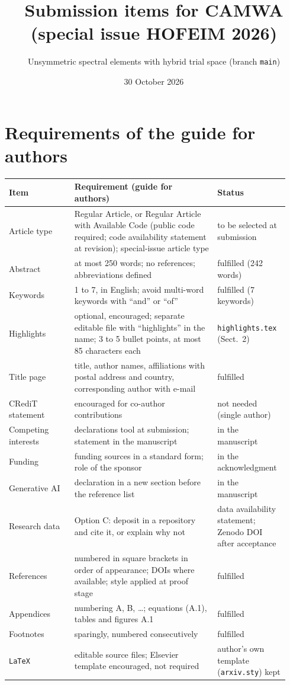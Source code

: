 \documentclass[10pt,a4paper]{article}
\title{Submission items for CAMWA (special issue HOFEIM 2026)}
\author{Unsymmetric spectral elements with hybrid trial space (branch \texttt{main})}
\date{30 October 2026}
\begin{document}
\maketitle
\vspace{-1em}

\section{Requirements of the guide for authors}

\begin{center}\small
\begin{tabular}{@{}p{0.22\linewidth}p{0.48\linewidth}p{0.24\linewidth}@{}}
\toprule
Item & Requirement (guide for authors) & Status \\
\midrule
Article type & Regular Article, or Regular Article with Available Code (public code required; code availability statement at revision); special-issue article type & to be selected at submission \\
Abstract & at most 250 words; no references; abbreviations defined & fulfilled (242 words) \\
Keywords & 1 to 7, in English; avoid multi-word keywords with ``and'' or ``of'' & fulfilled (7 keywords) \\
Highlights & optional, encouraged; separate editable file with ``highlights'' in the name; 3 to 5 bullet points, at most 85 characters each & \texttt{highlights.tex} (Sect.~2) \\
Title page & title, author names, affiliations with postal address and country, corresponding author with e-mail & fulfilled \\
CRediT statement & encouraged for co-author contributions & not needed (single author) \\
Competing interests & declarations tool at submission; statement in the manuscript & in the manuscript \\
Funding & funding sources in a standard form; role of the sponsor & in the acknowledgment \\
Generative AI & declaration in a new section before the reference list & in the manuscript \\
Research data & Option C: deposit in a repository and cite it, or explain why not & data availability statement; Zenodo DOI after acceptance \\
References & numbered in square brackets in order of appearance; DOIs where available; style applied at proof stage & fulfilled \\
Appendices & numbering A, B, \dots; equations (A.1), tables and figures A.1 & fulfilled \\
Footnotes & sparingly, numbered consecutively & fulfilled \\
\texttt{LaTeX} & editable source files; Elsevier template encouraged, not required & author's own template (\texttt{arxiv.sty}) kept \\
\bottomrule
\end{tabular}
\end{center}
\end{document}
